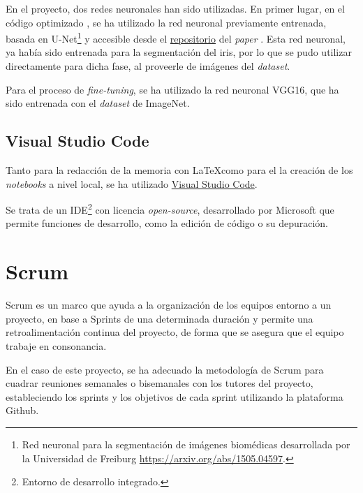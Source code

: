 En el proyecto, dos redes neuronales han sido utilizadas. En primer lugar, en el código optimizado \cite{tfg_iris_2020}, se ha utilizado la red neuronal previamente entrenada, basada en U-Net\footnote{Red neuronal para la segmentación de imágenes biomédicas desarrollada por la Universidad de Freiburg \url{https://arxiv.org/abs/1505.04597}.} y accesible desde el \href{https://github.com/jus390/U-net-Iris-segmentation}{repositorio} del \textit{paper} \cite{lozej_end--end_2018}. Esta red neuronal, ya había sido
entrenada para la segmentación del iris, por lo que se pudo utilizar directamente para dicha fase, al proveerle de imágenes del \textit{dataset}.

Para el proceso de \textit{fine-tuning}, se ha utilizado la red neuronal VGG16, que ha sido entrenada con el \textit{dataset} de ImageNet.

\subsection{Visual Studio Code}

Tanto para la redacción de la memoria con \LaTeX como para el la creación de los \textit{notebooks} a nivel local, se ha utilizado \href{https://code.visualstudio.com/}{Visual Studio Code}.

Se trata de un IDE\footnote{Entorno de desarrollo integrado.} con licencia \textit{open-source}, desarrollado por Microsoft que permite funciones de desarrollo, como la edición de código o su depuración.

\section{Scrum}
Scrum es un marco que ayuda a la organización de los equipos entorno a un proyecto, en base a Sprints de una determinada duración y permite una retroalimentación
continua del proyecto, de forma que se asegura que el equipo trabaje en consonancia.

En el caso de este proyecto, se ha adecuado la metodología de Scrum para cuadrar reuniones semanales o bisemanales con los tutores del proyecto, estableciendo
los sprints y los objetivos de cada sprint utilizando la plataforma Github.





